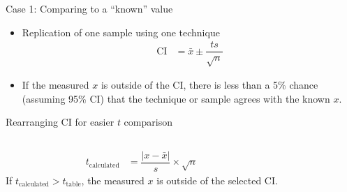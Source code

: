 \documentclass[handout]{beamer}
\begin{document}
\begin{frame}{Case 1: Comparing to a ``known'' value}
	\begin{itemize}
		\item Replication of \alert{one} sample using \alert{one}
			technique
			\begin{align*}
				\text{CI} &= \bar{x} \pm \dfrac{ts}{\sqrt{n}}
			\end{align*}
		\item If the measured $x$ is outside of the CI, there is less
			than a 5\% chance (assuming 95\% CI) that the technique or sample agrees
			with the known $x$.
	\end{itemize}

	\begin{block}{Rearranging CI for easier $t$ comparison}
		\begin{columns}
			\begin{align*}
				t_{\text{calculated}} &= \dfrac{|x -
				\bar{x}|}{s} \times \sqrt{n}
			\end{align*}
			If $t_{\text{calculated}} > t_{\text{table}}$, the
			measured $x$ is \alert{outside} of the
			\alert{selected} CI.
		\end{columns}
	\end{block}
\end{frame}
\end{document}
